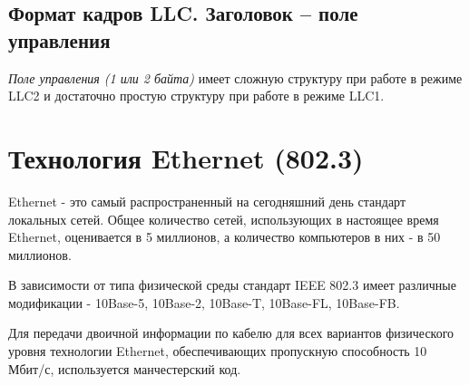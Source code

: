 \subsection{Формат кадров LLC. Заголовок – поле управления}
\emph{Поле управления (1 или 2 байта)} имеет сложную структуру при работе в режиме LLC2 и достаточно простую структуру при работе в режиме LLC1.

\begin{table}[!ht]
    \caption{Структура поля управления для кадров различного типа}
    \label{tab:control-sctructure}
    \centering
\end{table}

\section{Технология Ethernet (802.3)}
Ethernet - это самый распространенный на сегодняшний день стандарт локальных сетей.
Общее количество сетей, использующих в настоящее время Ethernet, оценивается в 5 миллионов, а количество компьютеров в них - в 50 миллионов.

В зависимости от типа физической среды стандарт IEEE 802.3 имеет различные модификации - 10Base-5, 10Base-2, 10Base-T, 10Base-FL, 10Base-FB.

Для передачи двоичной информации по кабелю для всех вариантов физического уровня технологии Ethernet, обеспечивающих пропускную способность 10 Мбит/с,  используется манчестерский код.

